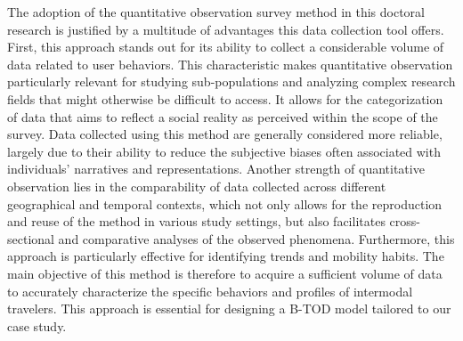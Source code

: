 \begin{refsegment}
The adoption of the quantitative observation survey method in this doctoral research is justified by a multitude of advantages this data collection tool offers. First, this approach stands out for its ability to collect a considerable volume of data related to user behaviors. This characteristic makes quantitative observation particularly relevant for studying sub-populations and analyzing complex research fields that might otherwise be difficult to access. It allows for the categorization of data that aims to reflect a social reality as perceived within the scope of the survey. Data collected using this method are generally considered more reliable, largely due to their ability to reduce the subjective biases often associated with individuals' narratives and representations. Another strength of quantitative observation lies in the comparability of data collected across different geographical and temporal contexts, which not only allows for the reproduction and reuse of the method in various study settings, but also facilitates cross-sectional and comparative analyses of the observed phenomena. Furthermore, this approach is particularly effective for identifying trends and mobility habits. The main objective of this method is therefore to acquire a sufficient volume of data to accurately characterize the specific behaviors and profiles of intermodal travelers. This approach is essential for designing a \acrfull{B-TOD} model tailored to our case study.%


\end{refsegment}
